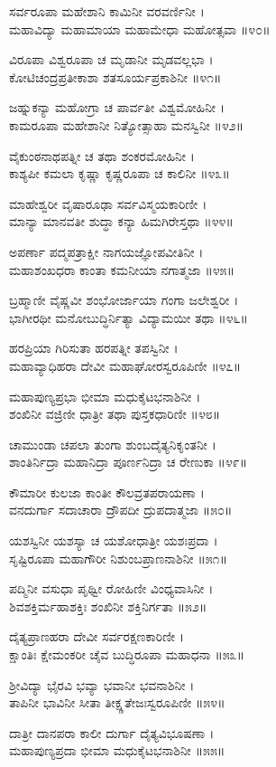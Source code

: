 ಸರ್ವರೂಪಾ ಮಹೇಶಾನಿ ಕಾಮಿನೀ ವರವರ್ಣಿನೀ ।\\
ಮಹಾವಿದ್ಯಾ ಮಹಾಮಾಯಾ ಮಹಾಮೇಧಾ ಮಹೋತ್ಸವಾ ॥೪೦॥

ವಿರೂಪಾ ವಿಶ್ವರೂಪಾ ಚ ಮೃಡಾನೀ ಮೃಡವಲ್ಲಭಾ ।\\
ಕೋಟಿಚಂದ್ರಪ್ರತೀಕಾಶಾ ಶತಸೂರ್ಯಪ್ರಕಾಶಿನೀ ॥೪೧॥

ಜಹ್ನುಕನ್ಯಾ ಮಹೋಗ್ರಾ ಚ ಪಾರ್ವತೀ ವಿಶ್ವಮೋಹಿನೀ ।\\
ಕಾಮರೂಪಾ ಮಹೇಶಾನೀ ನಿತ್ಯೋತ್ಸಾಹಾ ಮನಸ್ವಿನೀ ॥೪೨॥

ವೈಕುಂಠನಾಥಪತ್ನೀ ಚ ತಥಾ ಶಂಕರಮೋಹಿನೀ ।\\
ಕಾಶ್ಯಪೀ ಕಮಲಾ ಕೃಷ್ಣಾ ಕೃಷ್ಣರೂಪಾ ಚ ಕಾಲಿನೀ ॥೪೩॥

ಮಾಹೇಶ್ವರೀ ವೃಷಾರೂಢಾ ಸರ್ವವಿಸ್ಮಯಕಾರಿಣೀ ।\\
ಮಾನ್ಯಾ ಮಾನವತೀ ಶುದ್ಧಾ ಕನ್ಯಾ ಹಿಮಗಿರೇಸ್ತಥಾ ॥೪೪॥

ಅಪರ್ಣಾ ಪದ್ಮಪತ್ರಾಕ್ಷೀ ನಾಗಯಜ್ಞೋಪವೀತಿನೀ ।\\
ಮಹಾಶಂಖಧರಾ ಕಾಂತಾ ಕಮನೀಯಾ ನಗಾತ್ಮಜಾ ॥೪೫॥

ಬ್ರಹ್ಮಾಣೀ ವೈಷ್ಣವೀ ಶಂಭೋರ್ಜಾಯಾ ಗಂಗಾ ಜಲೇಶ್ವರೀ ।\\
ಭಾಗೀರಥೀ ಮನೋಬುದ್ಧಿರ್ನಿತ್ಯಾ ವಿದ್ಯಾಮಯೀ ತಥಾ ॥೪೬॥

ಹರಪ್ರಿಯಾ ಗಿರಿಸುತಾ ಹರಪತ್ನೀ ತಪಸ್ವಿನೀ ।\\
ಮಹಾವ್ಯಾಧಿಹರಾ ದೇವೀ ಮಹಾಘೋರಸ್ವರೂಪಿಣೀ ॥೪೭॥

ಮಹಾಪುಣ್ಯಪ್ರಭಾ ಭೀಮಾ ಮಧುಕೈಟಭನಾಶಿನೀ ।\\
ಶಂಖಿನೀ ವಜ್ರಿಣೀ ಧಾತ್ರೀ ತಥಾ ಪುಸ್ತಕಧಾರಿಣೀ ॥೪೮॥

ಚಾಮುಂಡಾ ಚಪಲಾ ತುಂಗಾ ಶುಂಬದೈತ್ಯನಿಕೃಂತನೀ ।\\
ಶಾಂತಿರ್ನಿದ್ರಾ ಮಹಾನಿದ್ರಾ ಪೂರ್ಣನಿದ್ರಾ ಚ ರೇಣುಕಾ ॥೪೯॥

ಕೌಮಾರೀ ಕುಲಜಾ ಕಾಂತೀ ಕೌಲವ್ರತಪರಾಯಣಾ ।\\
ವನದುರ್ಗಾ ಸದಾಚಾರಾ ದ್ರೌಪದೀ ದ್ರುಪದಾತ್ಮಜಾ ॥೫೦॥

ಯಶಸ್ವಿನೀ ಯಶಸ್ಯಾ ಚ ಯಶೋಧಾತ್ರೀ ಯಶಃಪ್ರದಾ ।\\
ಸೃಷ್ಟಿರೂಪಾ ಮಹಾಗೌರೀ ನಿಶುಂಬಪ್ರಾಣನಾಶಿನೀ ॥೫೧॥

ಪದ್ಮಿನೀ ವಸುಧಾ ಪೃಥ್ವೀ ರೋಹಿಣೀ ವಿಂಧ್ಯವಾಸಿನೀ ।\\
ಶಿವಶಕ್ತಿರ್ಮಹಾಶಕ್ತಿಃ ಶಂಖಿನೀ ಶಕ್ತಿನಿರ್ಗತಾ ॥೫೨॥

ದೈತ್ಯಪ್ರಾಣಹರಾ ದೇವೀ ಸರ್ವರಕ್ಷಣಕಾರಿಣೀ ।\\
ಕ್ಷಾಂತಿಃ ಕ್ಷೇಮಂಕರೀ ಚೈವ ಬುದ್ಧಿರೂಪಾ ಮಹಾಧನಾ ॥೫೩॥

ಶ್ರೀವಿದ್ಯಾ ಭೈರವಿ ಭವ್ಯಾ ಭವಾನೀ ಭವನಾಶಿನೀ ।\\
ತಾಪಿನೀ ಭಾವಿನೀ ಸೀತಾ ತೀಕ್ಷ್ಣತೇಜಃಸ್ವರೂಪಿಣೀ ॥೫೪॥

ದಾತ್ರೀ ದಾನಪರಾ ಕಾಲೀ ದುರ್ಗಾ ದೈತ್ಯವಿಭೂಷಣಾ ।\\
ಮಹಾಪುಣ್ಯಪ್ರದಾ ಭೀಮಾ ಮಧುಕೈಟಭನಾಶಿನೀ ॥೫೫॥

